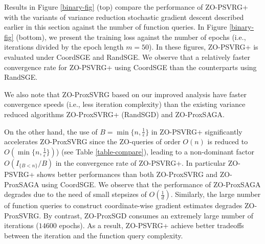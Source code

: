 \documentclass{article}
\theoremstyle{definition}
\theoremstyle{remark}
\begin{document}
Results in Figure \ref{binary-fig} (top) compare the performance of ZO-PSVRG+ with the variants of variance reduction stochastic gradient descent described earlier in this section against the number of function queries.
{\color{Brown}
In Figure \ref{binary-fig} (bottom), we present the training loss against the number of epochs (i.e., iterations divided by the
epoch length $m = 50$). In these figures, ZO-PSVRG+ is evaluated under CoordSGE and RandSGE.
{\color{Brown}
We observe that a relatively faster convergence rate for ZO-PSVRG+ using CoordSGE than the counterparts using RandSGE. 
}
}
  
{\color{Brown}
We also note that ZO-ProxSVRG based on
our improved analysis have faster
convergence speeds (i.e., less iteration complexity) than the existing variance reduced algorithms ZO-ProxSVRG+ (RandSGD) and ZO-ProxSAGA.
}

On the other hand, the use of $B = \min\{n, \frac{1}{\epsilon}\}$ in ZO-PSVRG+ significantly
accelerates ZO-ProxSVRG since the ZO-queries of order $O(n)$ is reduced to $O(\min\{n, \frac{1}{\epsilon}\})$) (see Table \ref{table-compare}), leading
to a non-dominant factor $O(I_{\{B < n\}}/B)$ in the convergence rate of ZO-PSVRG+.
{\color{Green}
In particular ZO-PSVRG+ shows better performances than both {\color{red} ZO-ProxSVRG and ZO-ProxSAGA
using CoordSGE}. }
{\color{red} We observe that the performance of ZO-ProxSAGA degrades due to the need of small stepsizes of $O(\frac{1}{d})$. Similarly, the large number of function queries to construct
coordinate-wise gradient estimates degrades ZO-ProxSVRG. By contrast, ZO-ProxSGD consumes an extremely large number of iterations ($14600$ epochs). As a result, ZO-PSVRG+ achieve better tradeoffs between the iteration and the function query complexity.}
\end{document}
